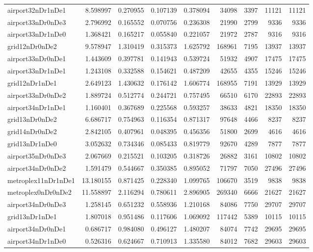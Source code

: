 \begin{longtable}{|l|r|r|r|r|r|r|r|r|}
airport32nDr1nDe1 & 8.598997 & 0.270955 & 0.107139 & 0.378094 & 34098 & 3397 & 11121 & 11121 \\
airport33nDr0nDe3 & 2.796992 & 0.165552 & 0.070756 & 0.236308 & 21990 & 2799 & 9336 & 9336 \\
airport33nDr1nDe0 & 1.368421 & 0.165217 & 0.055840 & 0.221057 & 21972 & 2787 & 9316 & 9316 \\
grid12nDr0nDe2 & 9.578947 & 1.310419 & 0.315373 & 1.625792 & 168961 & 7195 & 13937 & 13937 \\
airport33nDr0nDe1 & 1.443609 & 0.397781 & 0.141943 & 0.539724 & 51932 & 4907 & 17475 & 17475 \\
airport33nDr1nDe1 & 1.243108 & 0.332588 & 0.154621 & 0.487209 & 42655 & 4355 & 15246 & 15246 \\
grid12nDr1nDe1 & 2.649123 & 1.430632 & 0.176142 & 1.606774 & 168955 & 7191 & 13929 & 13929 \\
airport33nDr0nDe2 & 1.889724 & 0.512774 & 0.244721 & 0.757495 & 66510 & 6170 & 22893 & 22893 \\
airport34nDr1nDe1 & 1.160401 & 0.367689 & 0.225568 & 0.593257 & 38633 & 4821 & 18350 & 18350 \\
grid13nDr0nDe2 & 6.686717 & 0.754963 & 0.116354 & 0.871317 & 97648 & 4466 & 8237 & 8237 \\
grid14nDr0nDe2 & 2.842105 & 0.407961 & 0.048395 & 0.456356 & 51800 & 2699 & 4616 & 4616 \\
grid13nDr1nDe0 & 3.052632 & 0.734346 & 0.085433 & 0.819779 & 92670 & 4289 & 7877 & 7877 \\
airport35nDr0nDe3 & 2.067669 & 0.215521 & 0.103205 & 0.318726 & 26882 & 3161 & 10802 & 10802 \\
airport34nDr0nDe2 & 1.591479 & 0.544667 & 0.350385 & 0.895052 & 71797 & 7050 & 27496 & 27496 \\
metroplex11nDr1nDe1 & 13.180155 & 0.871425 & 0.228340 & 1.099765 & 106670 & 3519 & 9838 & 9838 \\
metroplex0nDr0nDe2 & 11.558897 & 2.116294 & 0.780611 & 2.896905 & 269340 & 6666 & 21627 & 21627 \\
airport34nDr0nDe3 & 1.258145 & 0.651232 & 0.558936 & 1.210168 & 84086 & 7750 & 29707 & 29707 \\
grid13nDr1nDe1 & 1.807018 & 0.951486 & 0.117606 & 1.069092 & 117442 & 5389 & 10115 & 10115 \\
airport34nDr0nDe1 & 0.686717 & 0.984080 & 0.496127 & 1.480207 & 84074 & 7742 & 29695 & 29695 \\
airport34nDr1nDe0 & 0.526316 & 0.624667 & 0.710913 & 1.335580 & 84012 & 7682 & 29603 & 29603 \\

\end{longtable}
